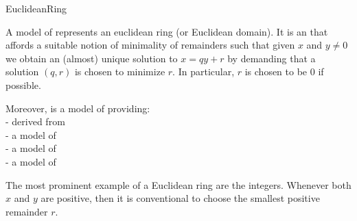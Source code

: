 \begin{ccRefConcept}{EuclideanRing}


\ccDefinition

A model of  represents an euclidean ring (or Euclidean domain). 
It is an  that affords a suitable notion of minimality of remainders 
such that given $x$ and $y \neq 0$ we obtain an (almost) unique solution to 
$ x = qy + r $ by demanding that a solution $(q,r)$ is chosen to minimize $r$. 
In particular, $r$ is chosen to be $0$ if possible.

Moreover,  is a model of 
 providing:\\
 
-  derived from  \\
-  a model of \\
-  a model of \\
-  a model of \\





The most prominent example of a Euclidean ring are the integers. 
Whenever both $x$ and $y$ are positive, then it is conventional to choose 
the smallest positive remainder $r$. 




\ccRefines

\ccSeeAlso

\\
\\
\\
\\
\\
\\
\\
\\
\\


\end{ccRefConcept}
